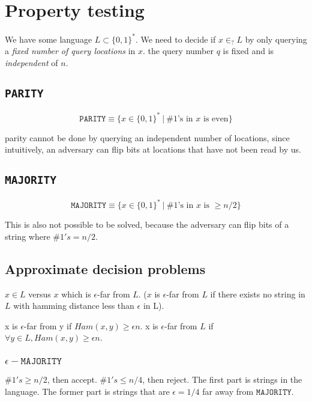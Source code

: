 \newcommand{\parity}{\texttt{PARITY}}
\newcommand{\majority}{\texttt{MAJORITY}}
\newcommand{\sorted}{\texttt{SORTED}}
\chapter{Property testing}

We have some language $L \subset \{0, 1\}^*$. We need to decide if $x \in_? L$
by only querying a \textit{fixed number of query locations} in $x$.
the query number $q$ is fixed and is \textit{independent} of $n$.


\section{\parity}

$$\parity \equiv \{ x \in \{0, 1\}^*~|~ \text{$\#1$'s in $x$ is even} \}$$

parity cannot be done by querying an independent number of locations, since
intuitively, an adversary can flip bits at locations that have not been read by
us.

\section{\majority}


$$
\majority \equiv \{x \in \{0, 1\}^*~|~ \text{$\#1$'s in $x$ is $\geq n/2$} \}
$$

This is also not possible to be solved, because the adversary can flip bits
of a string where $\#1's = n / 2$.

\section{Approximate decision problems}

$x \in L$ versus $x$ which is $\epsilon$-far from $L$. ($x$ is $\epsilon$-far
from $L$ if there exists no string in $L$ with hamming distance less than
$\epsilon$ in L).

x is $\epsilon$-far from y if $Ham(x, y) \geq \epsilon n$.
x is $\epsilon$-far from $L$ if $\forall y \in L, Ham(x, y) \geq \epsilon n$.

\subsection{$\epsilon-\majority$}
$\#1's \geq n/2$, then accept. $\#1's \leq n/4$, then reject.
The first part is strings in the language. The former part is strings
that are $\epsilon = 1/4$ far away from $\majority$.


